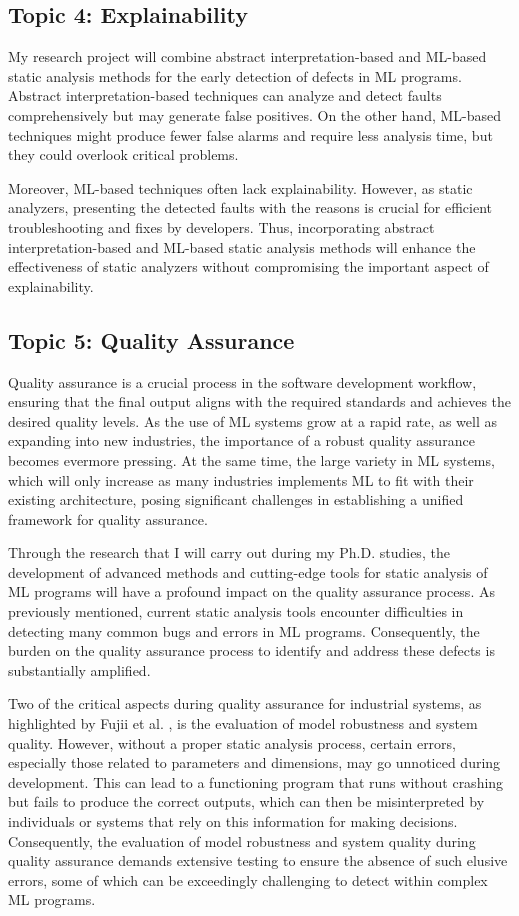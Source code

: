 \documentclass[11pt]{article}
\begin{document}
\subsection*{ Topic 4: Explainability }
My research project will combine abstract interpretation-based and ML-based static analysis methods for the early detection of defects in ML programs. Abstract interpretation-based techniques can analyze and detect faults comprehensively but may generate false positives. On the other hand, ML-based techniques might produce fewer false alarms and require less analysis time, but they could overlook critical problems. 

Moreover, ML-based techniques often lack explainability. However, as static analyzers, presenting the detected faults with the reasons is crucial for efficient troubleshooting and fixes by developers. Thus, incorporating abstract interpretation-based and ML-based static analysis methods will enhance the effectiveness of static analyzers without compromising the important aspect of explainability.

\subsection*{ Topic 5: Quality Assurance }
Quality assurance is a crucial process in the software development workflow, ensuring that the final output aligns with the required standards and achieves the desired quality levels. As the use of ML systems grow at a rapid rate, as well as expanding into new industries, the importance of a robust quality assurance becomes evermore pressing. At the same time, the large variety in ML systems, which will only increase as many industries implements ML to fit with their existing architecture, posing significant challenges in establishing a unified framework for quality assurance.

Through the research that I will carry out during my Ph.D. studies, the development of advanced methods and cutting-edge tools for static analysis of ML programs will have a profound impact on the quality assurance process. As previously mentioned, current static analysis tools encounter difficulties in detecting many common bugs and errors in ML programs. Consequently, the burden on the quality assurance process to identify and address these defects is substantially amplified.

Two of the critical aspects during quality assurance for industrial systems, as highlighted by Fujii et al. \cite{fujiiGuidelinesQualityAssurance2020}, is the evaluation of model robustness and system quality. However, without a proper static analysis process, certain errors, especially those related to parameters and dimensions, may go unnoticed during development. This can lead to a functioning program that runs without crashing but fails to produce the correct outputs, which can then be misinterpreted by individuals or systems that rely on this information for making decisions. Consequently, the evaluation of model robustness and system quality during quality assurance demands extensive testing to ensure the absence of such elusive errors, some of which can be exceedingly challenging to detect within complex ML programs.
\end{document}
